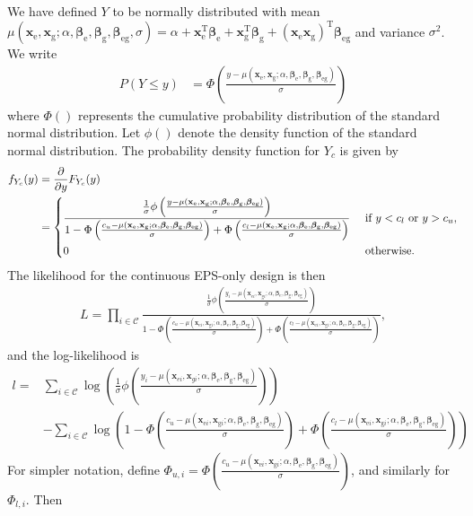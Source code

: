 \documentclass[10pt,a4paper]{article}
\def\bbetag{\bm{\beta}_{\text{g}}}
\def\bbetae{\bm{\beta}_{\text{e}}}
\def\bbetaeg{\bm{\beta}_{\text{eg}}}
\def\bxgi{\mathbf{x}_{\text{g}i}}
\def\bxei{\mathbf{x}_{\text{e}i}}
\def\bxg{\mathbf{x}_{\text{g}}}
\def\bxe{\mathbf{x}_{\text{e}}}
\begin{document}
We have defined $Y$ to be normally distributed with mean $\mu(\bxe, \bxg; \alpha, \bbetae, \bbetag, \bbetaeg, \sigma) = \alpha + \bxe^{\text{T}} \bbetae + \bxg^{\text{T}} \bbetag + (\bxe \bxg)^{\text{T}} \bbetaeg$ and variance $\sigma^2$. We write
\begin{align*}
P(Y \leq y) &= \Phi \left( \frac{y - \mu(\bxe, \bxg; \alpha, \bbetae, \bbetag, \bbetaeg)}{\sigma} \right)
\end{align*}
where $\Phi()$ represents the cumulative probability distribution of the standard normal distribution. Let $\phi()$ denote the density function of the standard normal distribution. The probability density function for $Y_c$ is given by
\begin{align*}
f_{Y_c}(y) 
& = \frac{\partial }{\partial y}F_{Y_c}(y) \\
& = \begin{dcases}
\frac{ \frac{1}{\sigma} \phi \left( \frac{y - \mu(\bxe, \bxg; \alpha, \bbetae, \bbetag, \bbetaeg)}{\sigma} \right)}{1 - \Phi \left( \frac{c_u - \mu(\bxe, \bxg; \alpha, \bbetae, \bbetag, \bbetaeg)}{\sigma} \right) + \Phi \left( \frac{c_l - \mu(\bxe, \bxg; \alpha, \bbetae, \bbetag, \bbetaeg)}{\sigma} \right)} & \text{ if } y < c_l \text{ or } y > c_u, \\
0 & \text{ otherwise. }
\end{dcases}
\end{align*}
The likelihood for the continuous EPS-only design is then
\begin{align*}
L = \prod_{i \in \mathcal{C}} \frac{ \frac{1}{\sigma} \phi \left( \frac{y_i - \mu(\bxei, \bxgi; \alpha, \bbetae, \bbetag, \bbetaeg)}{\sigma} \right)}{1 - \Phi \left( \frac{c_u - \mu(\bxei, \bxgi; \alpha, \bbetae, \bbetag, \bbetaeg)}{\sigma} \right) + \Phi \left( \frac{c_l - \mu(\bxei, \bxgi; \alpha, \bbetae, \bbetag, \bbetaeg)}{\sigma} \right)},
\end{align*}
and the log-likelihood is
\begin{align*}
l = &  \sum_{i \in \mathcal{C}} \log\left(\frac{1}{\sigma} \phi \left( \frac{y_i - \mu(\mathbf{x}_{ei}, \mathbf{x}_{gi}; \alpha, \bbetae, \bbetag, \bbetaeg)}{\sigma} \right) \right)
\\
& - \sum_{i \in \mathcal{C}} \log\left( 1 - \Phi \left( \frac{c_u - \mu(\bxei, \bxgi; \alpha, \bbetae, \bbetag, \bbetaeg)}{\sigma}\right) + \Phi \left( \frac{c_l - \mu(\bxei, \bxgi; \alpha, \bbetae, \bbetag, \bbetaeg)}{\sigma} \right) \right)
\end{align*}
For simpler notation, define $\Phi_{u,i} = \Phi \left( \frac{c_u - \mu(\bxei, \bxgi; \alpha, \bbetae, \bbetag, \bbetaeg)}{\sigma}\right)$, and similarly for $\Phi_{l,i}$. Then
\end{document}
